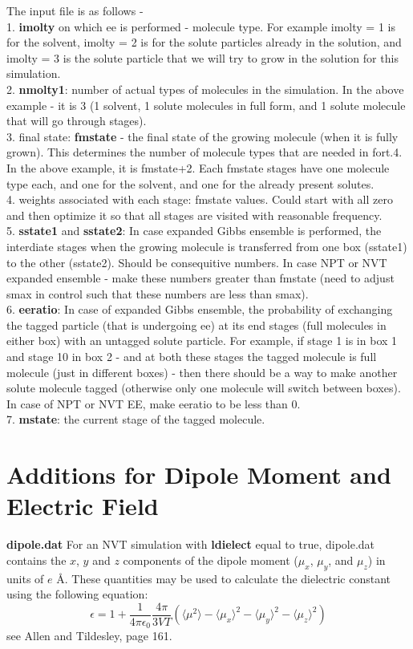 \documentclass[12pt,letterpaper]{article}
\begin{document}
{{{{{{\noindent  The input file is as follows - \\
1. {\bf imolty} on which ee is performed - molecule type.
For example imolty = 1 is for the solvent, imolty = 2 is for the
solute particles
already in the solution, and imolty = 3 is the solute particle that we
will try to grow in the solution for this simulation. \\
2. {\bf nmolty1}: number of actual types of molecules in the simulation.
In the above example - it is 3 (1 solvent, 1 solute molecules in full
form, and 1 solute molecule that will go through stages). \\
3. final state: {\bf fmstate} - the final state of the growing molecule (when
it is fully grown). This determines the number of molecule types that are
needed in fort.4. In the above example, it is fmstate+2. Each fmstate
stages have one molecule type each, and one for the solvent, and one
for the already present solutes.\\
4. weights associated with each stage: fmstate values. Could start with
all zero and then optimize it so that all stages are visited with
reasonable frequency.\\
5. {\bf sstate1} and {\bf sstate2}: In case expanded Gibbs ensemble is performed,
the interdiate stages when the growing molecule is transferred
from one box (sstate1) to the other (sstate2). Should be consequitive numbers.
In case NPT or NVT expanded ensemble - make these numbers greater than
fmstate (need to adjust smax in control such that these numbers are
less than smax). \\
6. {\bf eeratio}: In case of expanded Gibbs ensemble, the probability of
 exchanging the tagged particle (that is undergoing ee) at its
end stages (full molecules in either box) with an untagged solute particle.
For example, if stage 1 is in box 1 and stage 10 in box 2 - and
at both these stages the tagged molecule is full molecule (just in different
boxes) - then there should be a way to make another solute molecule
tagged (otherwise only one molecule will switch between boxes).
In case of NPT or NVT EE, make eeratio to be less than 0. \\
7. {\bf mstate}: the current stage of the tagged molecule.

\section{Additions for Dipole Moment and Electric Field}
\noindent \textbf{dipole.dat} For an NVT simulation with \textbf{ldielect} equal to true, dipole.dat contains the $x$, $y$ and $z$ components of the dipole moment ($\mu_x$, $\mu_y$, and $\mu_z$) in units of $e $ \AA.  These quantities may be used to calculate the dielectric constant using the following equation:
\begin{equation} 
\epsilon = 1 + \frac{1}{4 \pi \epsilon_0} \frac{4 \pi}{3 V T} \left ( \langle \mu^2 \rangle -
 \langle \mu_x \rangle^2  - \langle \mu_y \rangle^2 - \langle \mu_z \rangle^2 \right )
\end{equation}
see Allen and Tildesley, page 161.

}}}}}}
\end{document}
